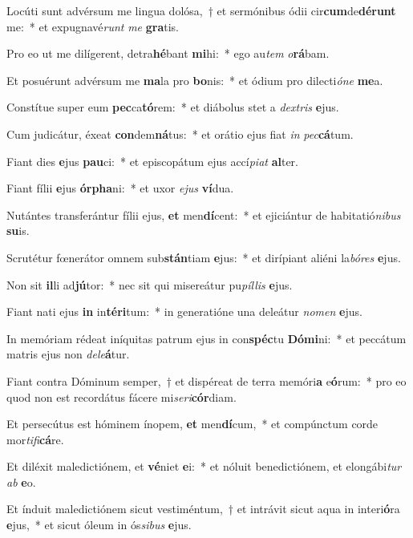 \item Locúti sunt advérsum me lingua dolósa,~† et sermónibus ódii cir\textbf{cum}de\textbf{dé}\textbf{runt} me:~* et expugnavé\textit{runt} \textit{me} \textbf{gra}tis.
\item Pro eo ut me dilígerent, detra\textbf{hé}bant \textbf{mi}hi:~* ego au\textit{tem} \textit{o}\textbf{rá}bam.
\item Et posuérunt advérsum me \textbf{ma}la pro \textbf{bo}nis:~* et ódium pro dilecti\textit{ó}\textit{ne} \textbf{me}a.
\item Constítue super eum \textbf{pec}ca\textbf{tó}rem:~* et diábolus stet a \textit{dex}\textit{tris} \textbf{e}jus.
\item Cum judicátur, éxeat \textbf{con}dem\textbf{ná}tus:~* et orátio ejus fiat \textit{in} \textit{pec}\textbf{cá}tum.
\item Fiant dies \textbf{e}jus \textbf{pau}ci:~* et episcopátum ejus accí\textit{pi}\textit{at} \textbf{al}ter.
\item Fiant fílii \textbf{e}jus \textbf{ór}\textbf{pha}ni:~* et uxor \textit{e}\textit{jus} \textbf{ví}dua.
\item Nutántes transferántur fílii ejus, \textbf{et} men\textbf{dí}cent:~* et ejiciántur de habitatió\textit{ni}\textit{bus} \textbf{su}is.
\item Scrutétur fœnerátor omnem sub\textbf{stán}tiam \textbf{e}jus:~* et dirípiant aliéni la\textit{bó}\textit{res} \textbf{e}jus.
\item Non sit \textbf{il}li ad\textbf{jú}tor:~* nec sit qui misereátur pu\textit{píl}\textit{lis} \textbf{e}jus.
\item Fiant nati ejus \textbf{in} in\textbf{tér}\textbf{i}tum:~* in generatióne una deleátur \textit{no}\textit{men} \textbf{e}jus.
\item In memóriam rédeat iníquitas patrum ejus in con\textbf{spéc}tu \textbf{Dó}\textbf{mi}ni:~* et peccátum matris ejus non \textit{de}\textit{le}\textbf{á}tur.
\item Fiant contra Dóminum semper,~† et dispéreat de terra memóri\textbf{a} e\textbf{ó}rum:~* pro eo quod non est recordátus fácere mi\textit{se}\textit{ri}\textbf{cór}diam.
\item Et persecútus est hóminem ínopem, \textbf{et} men\textbf{dí}cum,~* et compúnctum corde mor\textit{ti}\textit{fi}\textbf{cá}re.
\item Et diléxit maledictiónem, et \textbf{vé}niet \textbf{e}i:~* et nóluit benedictiónem, et elongábi\textit{tur} \textit{ab} \textbf{e}o.
\item Et índuit maledictiónem sicut vestiméntum,~† et intrávit sicut aqua in interi\textbf{ó}ra \textbf{e}jus,~* et sicut óleum in ós\textit{si}\textit{bus} \textbf{e}jus.
